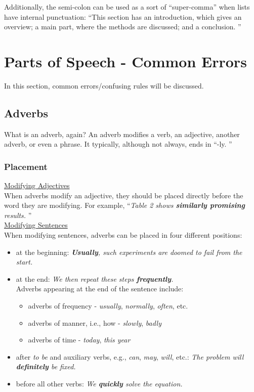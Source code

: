 Additionally, the semi-colon can be used as a sort of ``super-comma'' when lists have internal punctuation: ``This section has an introduction, which
gives an overview; a main part, where the methods are discussed; and a conclusion.
''

\section{Parts of Speech - Common Errors}
In this section, common errors/confusing rules will be discussed.
\subsection{Adverbs}
What is an adverb, again?
An adverb modifies a verb, an adjective, another adverb, or even a phrase.
It typically, although not always, ends in ``-ly.
''

\subsubsection{Placement}
\underline{Modifying Adjectives}\\

\noindent When adverbs modify an adjective, they should be placed directly before the word they are modifying.
For example, ``\textit{Table 2 shows \textbf{similarly promising} results.
}''\\

\noindent \underline{Modifying Sentences}\\

\noindent When modifying sentences, adverbs can be placed in four different positions:
\begin{itemize}
	\item at the beginning: \textit{\textbf{Usually}, such experiments are doomed to fail from the start.}
	\item at the end: \textit{We then repeat these steps \textbf{frequently}.}\\
	      Adverbs appearing at the end of the sentence include:

	      \begin{itemize}
		      \item adverbs of frequency - \textit{usually}, \textit{normally}, \textit{often}, etc.
		      \item adverbs of manner, i.e., how - \textit{slowly}, \textit{badly}
		      \item adverbs of time - \textit{today}, \textit{this year}
	      \end{itemize}
	\item after \textit{to be} and auxiliary verbs, e.g., \textit{can}, \textit{may}, \textit{will}, etc.: \textit{The problem will \textbf{definitely} be fixed.}
	\item before all other verbs: \textit{We \textbf{quickly} solve the equation.}
\end{itemize}

